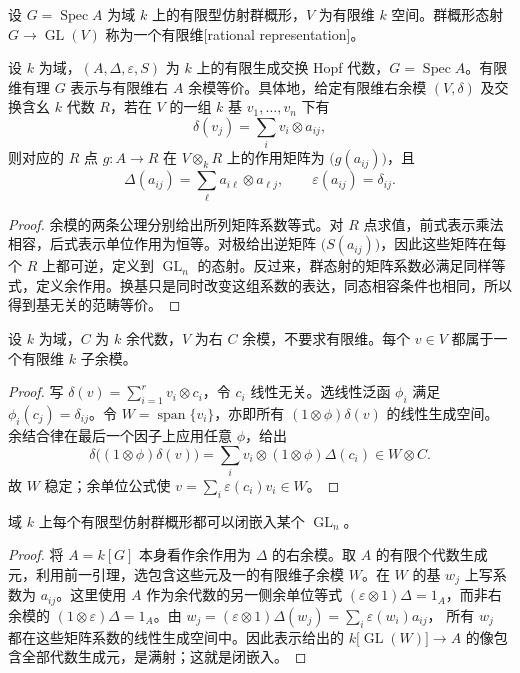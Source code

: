 \begin{definition}\label{b5:def:rational-representation}
	设 \(G=\operatorname{Spec}A\) 为域 \(k\) 上的有限型仿射群概形，\(V\) 为有限维 \(k\) 空间。群概形态射 \(G\to\operatorname{GL}(V)\) 称为一个有限维[rational representation]。
\end{definition}
\begin{theorem}\label{b5:thm:rational-comodule}
	设 \(k\) 为域，\((A,\Delta,\varepsilon,S)\) 为 \(k\) 上的有限生成交换 Hopf 代数，\(G=\operatorname{Spec}A\)。有限维有理 \(G\) 表示与有限维右 \(A\) 余模等价。具体地，给定有限维右余模 \((V,\delta)\) 及交换含幺 \(k\) 代数 \(R\)，若在 \(V\) 的一组 \(k\) 基 \(v_1,\ldots,v_n\) 下有
	\[
		\delta(v_j)=\sum_i v_i\otimes a_{ij},
	\]
	则对应的 \(R\) 点 \(g:A\to R\) 在 \(V\otimes_k R\) 上的作用矩阵为 \(\bigl(g(a_{ij})\bigr)\)，且
	\[
		\Delta(a_{ij})=\sum_\ell a_{i\ell}\otimes a_{\ell j},\qquad \varepsilon(a_{ij})=\delta_{ij}.
	\]
\end{theorem}
\begin{proof}
	余模的两条公理分别给出所列矩阵系数等式。对 \(R\) 点求值，前式表示乘法相容，后式表示单位作用为恒等。对极给出逆矩阵 \(\bigl(S(a_{ij})\bigr)\)，因此这些矩阵在每个 \(R\) 上都可逆，定义到 \(\operatorname{GL}_n\) 的态射。反过来，群态射的矩阵系数必满足同样等式，定义余作用。换基只是同时改变这组系数的表达，同态相容条件也相同，所以得到基无关的范畴等价。
\end{proof}
\begin{lemma}\label{b5:lem:comodule-locally-finite}
	设 \(k\) 为域，\(C\) 为 \(k\) 余代数，\(V\) 为右 \(C\) 余模，不要求有限维。每个 \(v\in V\) 都属于一个有限维 \(k\) 子余模。
\end{lemma}
\begin{proof}
	写 \(\delta(v)=\sum_{i=1}^r v_i\otimes c_i\)，令 \(c_i\) 线性无关。选线性泛函 \(\phi_i\) 满足 \(\phi_i(c_j)=\delta_{ij}\)。令 \(W=\operatorname{span}\{v_i\}\)，亦即所有 \((1\otimes\phi)\delta(v)\) 的线性生成空间。 余结合律在最后一个因子上应用任意 \(\phi\)，给出
	\[
		\delta\bigl((1\otimes\phi)\delta(v)\bigr) =\sum_i v_i\otimes(1\otimes\phi)\Delta(c_i)\in W\otimes C.
	\]
	故 \(W\) 稳定；余单位公式使 \(v=\sum_i\varepsilon(c_i)v_i\in W\)。
\end{proof}
\begin{corollary}\label{b5:thm:affine-group-linear}
	域 \(k\) 上每个有限型仿射群概形都可以闭嵌入某个 \(\operatorname{GL}_n\)。
\end{corollary}
\begin{proof}
	将 \(A=k[G]\) 本身看作余作用为 \(\Delta\) 的右余模。取 \(A\) 的有限个代数生成元，利用前一引理，选包含这些元及一的有限维子余模 \(W\)。在 \(W\) 的基 \(w_j\) 上写系数为 \(a_{ij}\)。这里使用 \(A\) 作为余代数的另一侧余单位等式 \((\varepsilon\otimes1)\Delta=1_A\)，而非右余模的 \((1\otimes\varepsilon)\Delta=1_A\)。由 \(w_j=(\varepsilon\otimes1)\Delta(w_j)=\sum_i\varepsilon(w_i)a_{ij}\)， 所有 \(w_j\) 都在这些矩阵系数的线性生成空间中。因此表示给出的 \(k\bigl[\operatorname{GL}(W)\bigr]\to A\) 的像包含全部代数生成元，是满射；这就是闭嵌入。
\end{proof}
